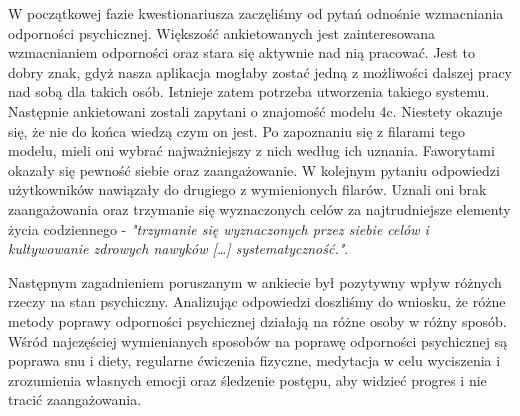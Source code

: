 W początkowej fazie kwestionariusza zaczęliśmy od pytań odnośnie wzmacniania
odporności psychicznej. Większość ankietowanych jest zainteresowana wzmacnianiem
odporności oraz stara się aktywnie nad nią pracować. Jest to dobry znak, gdyż
nasza aplikacja mogłaby zostać jedną z możliwości dalszej pracy nad sobą dla
takich osób. Istnieje zatem potrzeba utworzenia takiego systemu. Następnie
ankietowani zostali zapytani o znajomość modelu 4c. Niestety okazuje się, że nie
do końca wiedzą czym on jest. Po zapoznaniu się z filarami tego modelu, mieli
oni wybrać najważniejszy z nich według ich uznania. Faworytami okazały się
pewność siebie oraz zaangażowanie. W kolejnym pytaniu odpowiedzi użytkowników
nawiązały do drugiego z wymienionych filarów. Uznali oni brak zaangażowania oraz
trzymanie się wyznaczonych celów za najtrudniejsze elementy życia codziennego -
\textit{"trzymanie się wyznaczonych przez siebie celów i kultywowanie zdrowych
nawyków […] systematyczność."}.

Następnym zagadnieniem poruszanym w ankiecie był pozytywny wpływ różnych rzeczy
na stan psychiczny. Analizując odpowiedzi doszliśmy do wniosku, że różne metody
poprawy odporności psychicznej działają na różne osoby w różny sposób. Wśród
najczęściej wymienianych sposobów na poprawę odporności psychicznej są poprawa
snu i diety, regularne ćwiczenia fizyczne, medytacja w celu wyciszenia i
zrozumienia własnych emocji oraz śledzenie postępu, aby widzieć progres i nie
tracić zaangażowania.

